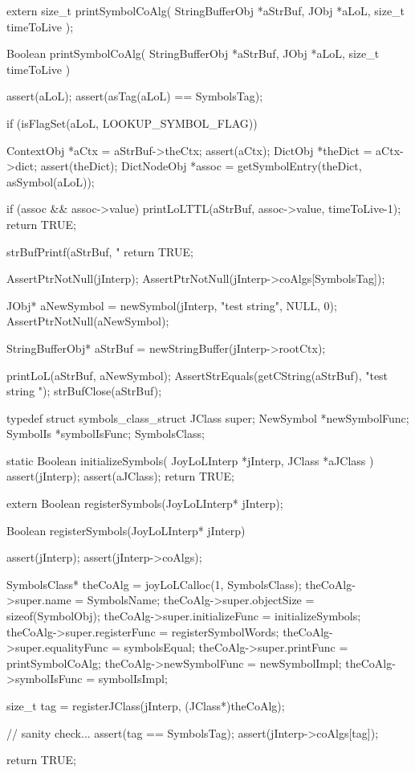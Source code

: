 
\startCHeader
extern size_t printSymbolCoAlg(
  StringBufferObj *aStrBuf,
  JObj            *aLoL,
  size_t           timeToLive
);
\stopCHeader
{}

\startCCode
Boolean printSymbolCoAlg(
  StringBufferObj *aStrBuf,
  JObj            *aLoL,
  size_t           timeToLive
) {
  assert(aLoL);
  assert(asTag(aLoL) == SymbolsTag);

  if (isFlagSet(aLoL, LOOKUP_SYMBOL_FLAG)) {
    ContextObj  *aCtx    = aStrBuf->theCtx;
    assert(aCtx);
    DictObj     *theDict = aCtx->dict;
    assert(theDict);
    DictNodeObj *assoc   =
      getSymbolEntry(theDict, asSymbol(aLoL));
  
    if (assoc && assoc->value) {
      printLoLTTL(aStrBuf, assoc->value, timeToLive-1);
      return TRUE;
    }
  }
  
  strBufPrintf(aStrBuf, "%
  return TRUE;
}
\stopCCode


\startCTest
  AssertPtrNotNull(jInterp);
  AssertPtrNotNull(jInterp->coAlgs[SymbolsTag]);

  JObj* aNewSymbol = newSymbol(jInterp, "test string", NULL, 0);
  AssertPtrNotNull(aNewSymbol);
  
  StringBufferObj* aStrBuf = newStringBuffer(jInterp->rootCtx);
  
  printLoL(aStrBuf, aNewSymbol);
  AssertStrEquals(getCString(aStrBuf),
    "test string ");
  strBufClose(aStrBuf);
\stopCTest
\stopTestCase
\stopTestSuite

\startTestSuite[registerSymbols]

\startCHeader
typedef struct symbols_class_struct {
  JClass  super;
  NewSymbol  *newSymbolFunc;
  SymbolIs   *symbolIsFunc;
} SymbolsClass;
\stopCHeader

\startCCode
static Boolean initializeSymbols(
  JoyLoLInterp *jInterp,
  JClass   *aJClass
) {
  assert(jInterp);
  assert(aJClass);
  return TRUE;
}
\stopCCode

\startCHeader
extern Boolean registerSymbols(JoyLoLInterp* jInterp);
\stopCHeader
{}

\startCCode
Boolean registerSymbols(JoyLoLInterp* jInterp) {
  assert(jInterp);
  assert(jInterp->coAlgs);
  
  SymbolsClass* theCoAlg = joyLoLCalloc(1, SymbolsClass);
  theCoAlg->super.name           = SymbolsName;
  theCoAlg->super.objectSize     = sizeof(SymbolObj);
  theCoAlg->super.initializeFunc = initializeSymbols;
  theCoAlg->super.registerFunc   = registerSymbolWords;
  theCoAlg->super.equalityFunc   = symbolsEqual;
  theCoAlg->super.printFunc      = printSymbolCoAlg;
  theCoAlg->newSymbolFunc        = newSymbolImpl;
  theCoAlg->symbolIsFunc         = symbolIsImpl;

  size_t tag =
    registerJClass(jInterp, (JClass*)theCoAlg);
  
  // sanity check...
  assert(tag == SymbolsTag);
  assert(jInterp->coAlgs[tag]);

  return TRUE;
}
\stopCCode

